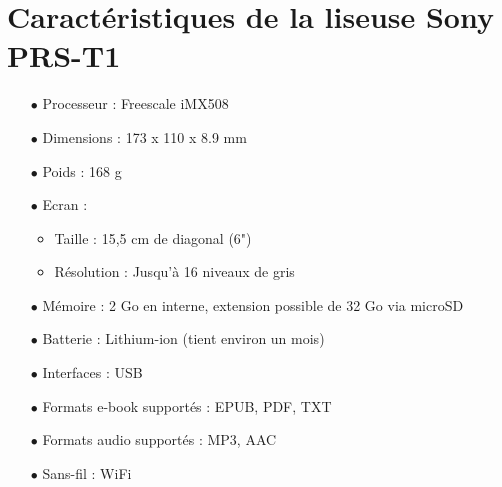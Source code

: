 \newpage

\section{Caractéristiques de la liseuse Sony PRS-T1}

\begin{itemize}
		\item[$\bullet$] Processeur : Freescale iMX508
		\item[$\bullet$] Dimensions : 173 x 110 x 8.9 mm
		\item[$\bullet$] Poids : 168 g
		\item[$\bullet$] Ecran :
			\begin{itemize}
				\item Taille : 15,5 cm de diagonal (6")
				\item Résolution : Jusqu'à 16 niveaux de gris
			\end{itemize}
		\item[$\bullet$] Mémoire : 2 Go en interne, extension possible de 32 Go via microSD
		\item[$\bullet$] Batterie : Lithium-ion (tient environ un mois)
		\item[$\bullet$] Interfaces : USB
		\item[$\bullet$] Formats e-book supportés : EPUB, PDF, TXT
		\item[$\bullet$] Formats audio supportés : MP3, AAC
		\item[$\bullet$] Sans-fil : WiFi
		
\end{itemize}

